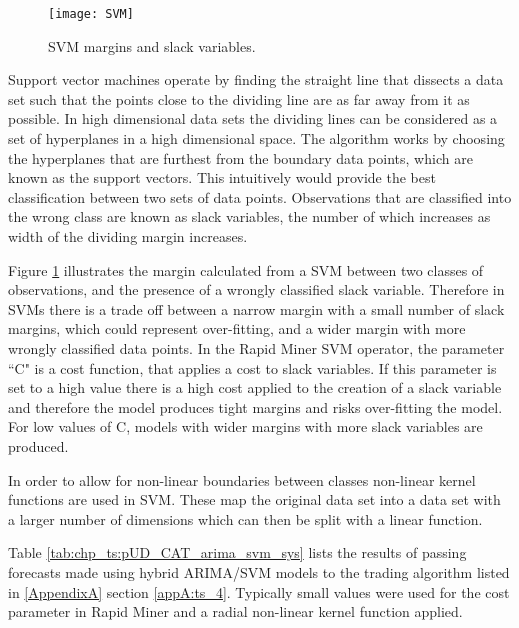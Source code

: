 \begin{figure}[tbph!]
\centering
\texttt{[image: SVM]}
\caption[SVM margins and slack variables]{SVM margins and slack variables.}
\label{fig:SVM}
\end{figure}

Support vector machines operate by finding the straight line that dissects a data set such that the points close to the dividing line are as far away from it as possible. In high dimensional data sets the dividing lines can be considered as a set of hyperplanes in a high dimensional space. The algorithm works by choosing the hyperplanes that are furthest from the boundary data points, which are known as the support vectors. This intuitively would provide the best classification between two sets of data points. Observations that are classified into the wrong class are known as slack variables, the number of which increases as width of the dividing margin increases. 

Figure \ref{fig:SVM} illustrates the margin calculated from a SVM between two classes of observations, and the presence of a wrongly classified slack variable. Therefore in SVMs there is a trade off between a narrow margin with a small number of slack margins, which could represent over-fitting, and a wider margin with more wrongly classified data points. In the Rapid Miner SVM operator, the parameter \textquotedblleft C" is a cost function, that applies a cost to slack variables. If this parameter is set to a high value there is a high cost applied to the creation of a slack variable and therefore the model produces tight margins and risks over-fitting the model. For low values of C, models with wider margins with more slack variables are produced.

In order to allow for non-linear boundaries between classes non-linear kernel functions are used in SVM. These map the original data set into a data set with a larger number of dimensions which can then be split with a linear function.

Table \ref{tab:chp_ts:pUD_CAT_arima_svm_sys} lists the results of passing forecasts made using hybrid ARIMA/SVM models to the trading algorithm listed in \ref{AppendixA} section \ref{appA:ts_4}. Typically small values were used for the cost parameter in Rapid Miner and a radial non-linear kernel function applied.




